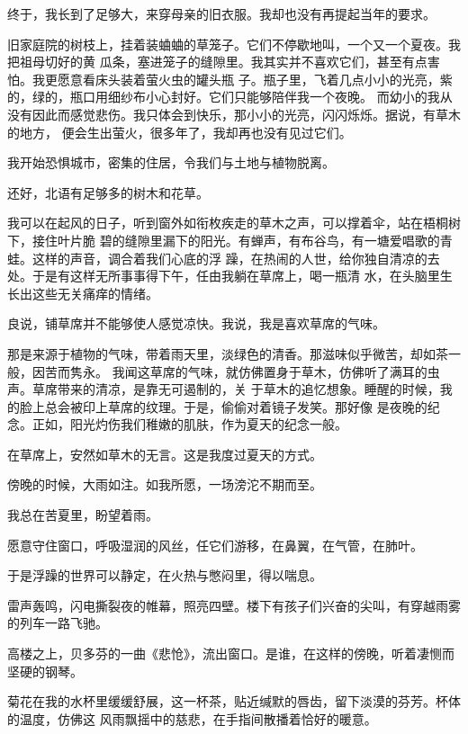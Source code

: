 		终于，我长到了足够大，来穿母亲的旧衣服。我却也没有再提起当年的要求。


		旧家庭院的树枝上，挂着装蛐蛐的草笼子。它们不停歇地叫，一个又一个夏夜。我把祖母切好的黄
	瓜条，塞进笼子的缝隙里。我其实并不喜欢它们，甚至有点害怕。我更愿意看床头装着萤火虫的罐头瓶
	子。瓶子里，飞着几点小小的光亮，紫的，绿的，瓶口用细纱布小心封好。它们只能够陪伴我一个夜晚。
	而幼小的我从没有因此而感觉悲伤。我只体会到快乐，那小小的光亮，闪闪烁烁。据说，有草木的地方，
	便会生出萤火，很多年了，我却再也没有见过它们。


		我开始恐惧城市，密集的住居，令我们与土地与植物脱离。

		还好，北语有足够多的树木和花草。

		我可以在起风的日子，听到窗外如衔枚疾走的草木之声，可以撑着伞，站在梧桐树下，接住叶片脆
	碧的缝隙里漏下的阳光。有蝉声，有布谷鸟，有一塘爱唱歌的青蛙。这样的声音，调合着我们心底的浮
	躁，在热闹的人世，给你独自清凉的去处。于是有这样无所事事得下午，任由我躺在草席上，喝一瓶清
	水，在头脑里生长出这些无关痛痒的情绪。


		良说，铺草席并不能够使人感觉凉快。我说，我是喜欢草席的气味。


		那是来源于植物的气味，带着雨天里，淡绿色的清香。那滋味似乎微苦，却如茶一般，因苦而隽永。
	我闻这草席的气味，就仿佛置身于草木，仿佛听了满耳的虫声。草席带来的清凉，是靠无可遏制的，关
	于草木的追忆想象。睡醒的时候，我的脸上总会被印上草席的纹理。于是，偷偷对着镜子发笑。那好像
	是夜晚的纪念。正如，阳光灼伤我们稚嫩的肌肤，作为夏天的纪念一般。


		在草席上，安然如草木的无言。这是我度过夏天的方式。

	\endwriting



		傍晚的时候，大雨如注。如我所愿，一场滂沱不期而至。\par
		我总在苦夏里，盼望着雨。\par
		愿意守住窗口，呼吸湿润的风丝，任它们游移，在鼻翼，在气管，在肺叶。


		于是浮躁的世界可以静定，在火热与憋闷里，得以喘息。


		雷声轰鸣，闪电撕裂夜的帷幕，照亮四壁。楼下有孩子们兴奋的尖叫，有穿越雨雾的列车一路飞驰。


		高楼之上，贝多芬的一曲《悲怆》，流出窗口。是谁，在这样的傍晚，听着凄恻而坚硬的钢琴。


		菊花在我的水杯里缓缓舒展，这一杯茶，贴近缄默的唇齿，留下淡漠的芬芳。杯体的温度，仿佛这
	风雨飘摇中的慈悲，在手指间散播着恰好的暖意。


